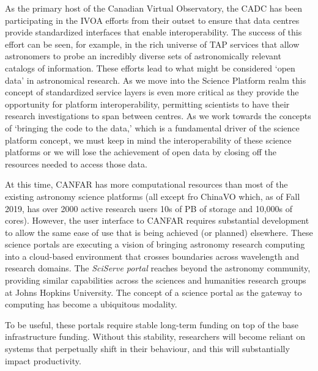 \documentclass[11pt]{article}
\begin{document}
As the primary host of the Canadian Virtual Observatory, the CADC has been participating in the IVOA efforts from their outset to ensure that data centres provide standardized interfaces that enable interoperability.  
The success of this effort can be seen, for example, in the rich universe of TAP services that allow astronomers to probe an incredibly diverse sets of astronomically relevant catalogs of information. 
These efforts lead to what might be considered `open data' in astronomical research. 
As we move into the Science Platform realm this concept of standardized service layers is even more critical as they provide the opportunity for platform interoperability, permitting scientists to have their research investigations to span between centres.  
As we work towards the concepts of `bringing the code to the data,' which is a fundamental driver of the science platform concept, we must keep in mind the interoperability of these science platforms or we will lose the achievement of open data by closing off the resources needed to access those data.

At this time, CANFAR has more computational resources than most of the existing astronomy science platforms (all except fro ChinaVO which, as of Fall 2019, has over 2000 active research users 10s of PB of storage and 10,000s of cores). 
However, the user interface to CANFAR requires substantial development to allow the same ease of use that is being achieved (or planned) elsewhere.
These science portals are executing a vision of bringing astronomy research computing into a cloud-based environment that crosses boundaries across wavelength and research domains. 
The {\it SciServe portal} reaches beyond the astronomy community, providing similar capabilities across the sciences and humanities research groups at Johns Hopkins University.
The concept of a science portal as the gateway to computing has become a ubiquitous modality. 

To be useful, these portals require stable long-term funding on top of the base infrastructure funding. Without this stability, researchers will become reliant on systems that perpetually shift in their behaviour, and this will substantially impact productivity.  
\end{document}
